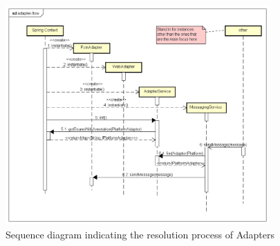 \begin{figure}[!ht]
	\centering
	\includegraphics[width=0.9\textwidth]{figures/03_design/adapter-flow}
    \caption{Sequence diagram indicating the resolution process of Adapters}
    \label{fig:adapter-flow}
\end{figure}
